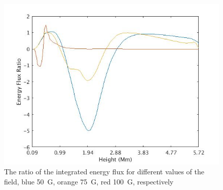 \documentclass{aastex62}
\begin{document}


\begin{figure}[h]\label{energyfluxratio_50G_75G_100G_line}
\includegraphics[scale=0.45]{imrescale/energyfluxratio.jpg}
\caption{The ratio of the integrated energy flux for different values of the field, blue 50~G, orange 75~G, red 100~G, respectively}
\end{figure}



\end{document}
